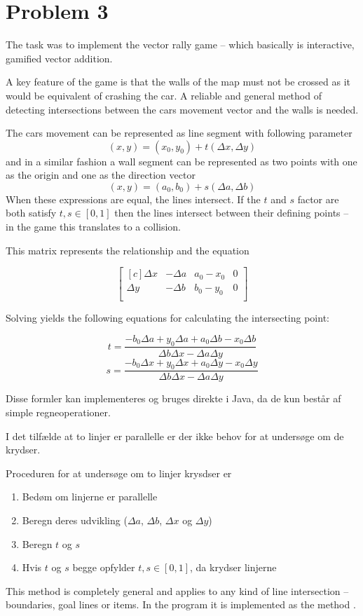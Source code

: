 \section*{Problem 3}

The task was to implement the vector rally game -- which basically is
interactive, gamified vector addition.

A key feature of the game is that the walls of the map must not be crossed as
it would be equivalent of crashing the car. A reliable and general method of
detecting intersections between the cars movement vector and the walls is
needed.

The cars movement can be represented as line segment with following parameter
$$ (x, y) = (x_0, y_0) + t (\Delta x, \Delta y) $$
and in a similar fashion a wall segment can be represented as two points with
one as the origin and one as the direction vector
$$ (x, y) = (a_0, b_0) + s (\Delta a, \Delta b) $$
When these expressions are equal, the lines intersect. If the $t$ and $s$
factor are both satisfy $t, s \in [0,1]$ then the lines intersect between
their defining points -- in the game this translates to a collision.

This matrix represents the relationship and the equation

$$
\begin{bmatrix*}[c]
 \Delta x & -\Delta a & a_0 - x_0 & 0 \\
 \Delta y & -\Delta b & b_0 - y_0 & 0\\
\end{bmatrix*}
$$

Solving yields the following equations for calculating the 
intersecting point:

$$ t = \frac{-b_0 \Delta a + y_0 \Delta a + a_0 \Delta b - x_0 \Delta b}{\Delta b \Delta x - \Delta a \Delta y} $$
$$ s = \frac{-b_0 \Delta x + y_0 \Delta x + a_0 \Delta y - x_0 \Delta y}{\Delta b \Delta x - \Delta a \Delta y} $$

Disse formler kan implementeres og bruges direkte i Java, da de kun består af simple regneoperationer.

I det tilfælde at to linjer er parallelle er der ikke behov for at undersøge om de krydser.

Proceduren for at undersøge om to linjer krysdser er
\begin{enumerate}
\item Bedøm om linjerne er parallelle
\item Beregn deres udvikling ($\Delta a$, $\Delta b$, $\Delta x$ og $\Delta y$)
\item Beregn $t$ og $s$
\item Hvis $t$ og $s$ begge opfylder $t, s \in [0,1]$, da krydser linjerne
\end{enumerate}

This method is completely general and applies to any kind of line intersection -- boundaries, goal lines or items. In the program it is implemented as the method .
